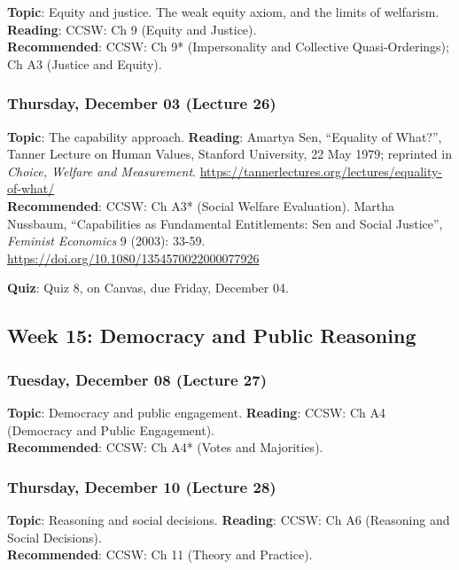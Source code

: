 \documentclass[
  letterpaper,
  DIV=11,
  numbers=noendperiod]{scrartcl}
\begin{document}
\textbf{Topic}: Equity and justice. The weak equity axiom, and the
limits of welfarism.\\
\textbf{Reading}: CCSW: Ch 9 (Equity and Justice).\\
\textbf{Recommended}: CCSW: Ch 9* (Impersonality and Collective
Quasi-Orderings); Ch A3 (Justice and Equity).

\subsubsection{Thursday, December 03 (Lecture
26)}\label{thursday-december-03-lecture-26}

\textbf{Topic}: The capability approach. \textbf{Reading}: Amartya Sen,
``Equality of What?'', Tanner Lecture on Human Values, Stanford
University, 22 May 1979; reprinted in \emph{Choice, Welfare and
Measurement}.
\url{https://tannerlectures.org/lectures/equality-of-what/}\\
\textbf{Recommended}: CCSW: Ch A3* (Social Welfare Evaluation). Martha
Nussbaum, ``Capabilities as Fundamental Entitlements: Sen and Social
Justice'', \emph{Feminist Economics} 9 (2003): 33-59.
\url{https://doi.org/10.1080/1354570022000077926}

\textbf{Quiz}: Quiz 8, on Canvas, due Friday, December 04.

\subsection{Week 15: Democracy and Public
Reasoning}\label{week-15-democracy-and-public-reasoning}

\subsubsection{Tuesday, December 08 (Lecture
27)}\label{tuesday-december-08-lecture-27}

\textbf{Topic}: Democracy and public engagement. \textbf{Reading}: CCSW:
Ch A4 (Democracy and Public Engagement).\\
\textbf{Recommended}: CCSW: Ch A4* (Votes and Majorities).

\subsubsection{Thursday, December 10 (Lecture
28)}\label{thursday-december-10-lecture-28}

\textbf{Topic}: Reasoning and social decisions. \textbf{Reading}: CCSW:
Ch A6 (Reasoning and Social Decisions).\\
\textbf{Recommended}: CCSW: Ch 11 (Theory and Practice).
\end{document}
